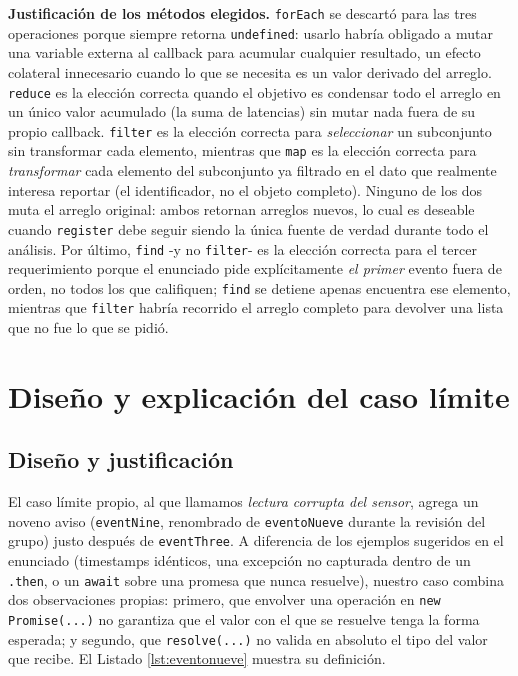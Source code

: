 \documentclass[conference,a4paper]{IEEEtran}
\begin{document}
\textbf{Justificaci\'on de los m\'etodos elegidos.} \texttt{forEach} se descart\'o para las tres operaciones porque siempre retorna \texttt{undefined}: usarlo habr\'ia obligado a mutar una variable externa al callback para acumular cualquier resultado, un efecto colateral innecesario cuando lo que se necesita es un valor derivado del arreglo. \texttt{reduce} es la elecci\'on correcta quando el objetivo es condensar todo el arreglo en un \'unico valor acumulado (la suma de latencias) sin mutar nada fuera de su propio callback. \texttt{filter} es la elecci\'on correcta para \emph{seleccionar} un subconjunto sin transformar cada elemento, mientras que \texttt{map} es la elecci\'on correcta para \emph{transformar} cada elemento del subconjunto ya filtrado en el dato que realmente interesa reportar (el identificador, no el objeto completo). Ninguno de los dos muta el arreglo original: ambos retornan arreglos nuevos, lo cual es deseable cuando \texttt{register} debe seguir siendo la \'unica fuente de verdad durante todo el an\'alisis. Por \'ultimo, \texttt{find} -y no \texttt{filter}- es la elecci\'on correcta para el tercer requerimiento porque el enunciado pide expl\'icitamente \emph{el primer} evento fuera de orden, no todos los que califiquen; \texttt{find} se detiene apenas encuentra ese elemento, mientras que \texttt{filter} habr\'ia recorrido el arreglo completo para devolver una lista que no fue lo que se pidi\'o.

\section{Dise\~no y explicaci\'on del caso l\'imite}
\label{sec:casolimite}

\subsection{Dise\~no y justificaci\'on}
El caso l\'imite propio, al que llamamos \emph{lectura corrupta del sensor}, agrega un noveno aviso (\texttt{eventNine}, renombrado de \texttt{eventoNueve} durante la revisi\'on del grupo) justo despu\'es de \texttt{eventThree}. A diferencia de los ejemplos sugeridos en el enunciado (timestamps id\'enticos, una excepci\'on no capturada dentro de un \texttt{.then}, o un \texttt{await} sobre una promesa que nunca resuelve), nuestro caso combina dos observaciones propias: primero, que envolver una operaci\'on en \texttt{new Promise(...)} no garantiza que el valor con el que se resuelve tenga la forma esperada; y segundo, que \texttt{resolve(...)} no valida en absoluto el tipo del valor que recibe. El Listado \ref{lst:eventonueve} muestra su definici\'on.
\end{document}
